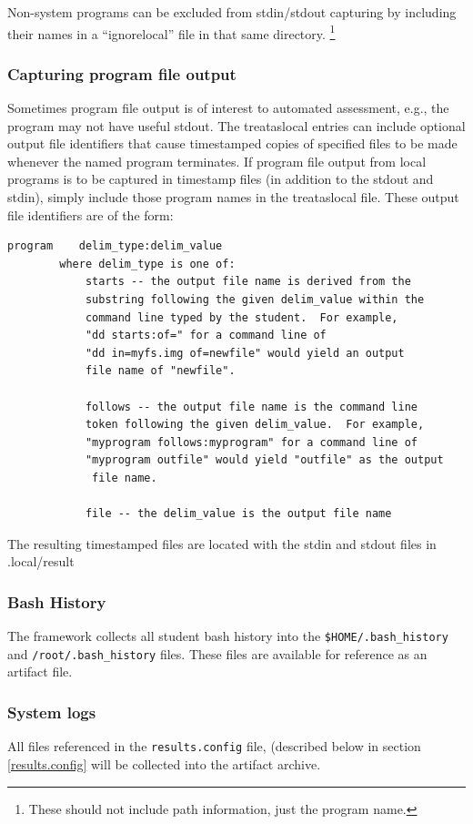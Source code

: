 \documentclass[12pt]{article}
\begin{document}
Non-system programs can be excluded from stdin/stdout capturing by including their names in
a ``ignorelocal'' file in that same directory.  \footnote{These should not include path information, just the program name.}

\subsubsection{Capturing program file output}
\label{program output}
Sometimes program file output is of interest to automated assessment, e.g., the program
may not have useful stdout.
The treataslocal entries can include optional output file identifiers that
cause timestamped copies of specified files to be made whenever the named program terminates.
If program file output from local programs is to be captured in timestamp files (in addition
to the stdout and stdin), simply include those program names in the treataslocal file.
These output file identifiers are of the form:
\begin{verbatim}
program    delim_type:delim_value
        where delim_type is one of:
            starts -- the output file name is derived from the 
            substring following the given delim_value within the 
            command line typed by the student.  For example, 
            "dd starts:of=" for a command line of 
            "dd in=myfs.img of=newfile" would yield an output 
            file name of "newfile".
     
            follows -- the output file name is the command line 
            token following the given delim_value.  For example, 
            "myprogram follows:myprogram" for a command line of
            "myprogram outfile" would yield "outfile" as the output 
             file name.

            file -- the delim_value is the output file name
\end{verbatim}
\noindent The resulting timestamped files are located with the stdin and stdout files in .local/result

\subsubsection{Bash History}
The framework collects all student bash history into the \texttt{\$HOME/.bash\_history} and \newline
\texttt{/root/.bash\_history} files.  These files are
available for reference as an artifact file.  

\subsubsection{System logs}
All files referenced in the {\tt results.config} file, (described below in section \ref{results.config}
will be collected into the artifact archive.  
\end{document}
